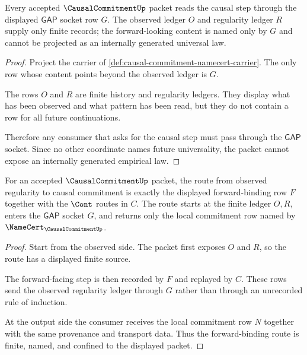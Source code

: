 \begin{theorem}
\label{thm:causal-commitment-gap-socket}
Every accepted $\CausalCommitmentUp$ packet reads the causal step through the displayed $\mathsf{GAP}$ socket row $G$. The observed ledger $O$ and regularity ledger $R$ supply only finite records; the forward-looking content is named only by $G$ and cannot be projected as an internally generated universal law.
\end{theorem}
\begin{proof}
Project the carrier of \autoref{def:causal-commitment-namecert-carrier}. The only row whose content points beyond the observed ledger is $G$.

The rows $O$ and $R$ are finite history and regularity ledgers. They display what has been observed and what pattern has been read, but they do not contain a row for all future continuations.

Therefore any consumer that asks for the causal step must pass through the $\mathsf{GAP}$ socket. Since no other coordinate names future universality, the packet cannot expose an internally generated empirical law.
\end{proof}

\begin{theorem}
\label{thm:causal-commitment-forward-binding-route}
For an accepted $\CausalCommitmentUp$ packet, the route from observed regularity to causal commitment is exactly the displayed forward-binding row $F$ together with the $\Cont$ routes in $C$. The route starts at the finite ledger $O,R$, enters the $\mathsf{GAP}$ socket $G$, and returns only the local commitment row named by $\NameCert_{\CausalCommitmentUp}$.
\end{theorem}
\begin{proof}
Start from the observed side. The packet first exposes $O$ and $R$, so the route has a displayed finite source.

The forward-facing step is then recorded by $F$ and replayed by $C$. These rows send the observed regularity ledger through $G$ rather than through an unrecorded rule of induction.

At the output side the consumer receives the local commitment row $N$ together with the same provenance and transport data. Thus the forward-binding route is finite, named, and confined to the displayed packet.
\end{proof}

